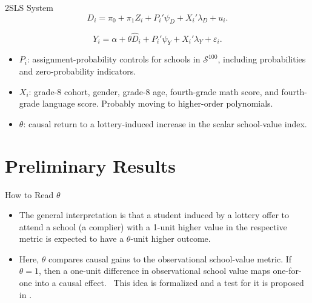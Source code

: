 \documentclass[notes,11pt,aspectratio=169]{beamer}
\newenvironment{wideitemize}{%
  \begin{minipage}{0.90\textwidth}
  \begin{itemize}
  \addtolength{\itemsep}{1em}
}{%
  \end{itemize}
  \end{minipage}
}
\begin{document}
\begin{frame}{2SLS System}
\small
\[
D_i
=
\pi_0
+
\pi_1 Z_i
+
P_i'\psi_D
+
X_i'\lambda_D
+
u_i .
\]

\[
Y_i
=
\alpha
+
\theta \widehat{D}_i
+
P_i'\psi_Y
+
X_i'\lambda_Y
+
\varepsilon_i .
\]

\vspace{0.6em}
\begin{wideitemize}
  \item \(P_i\): assignment-probability controls for schools in \(\mathcal{S}^{100}\), including probabilities and zero-probability indicators.
  \item \(X_i\): grade-8 cohort, gender, grade-8 age, fourth-grade math score, and fourth-grade language score. Probably moving to higher-order polynomials.
  \item \(\theta\): causal return to a lottery-induced increase in the scalar school-value index.
\end{wideitemize}
\end{frame}

\section{Preliminary Results}


\begin{frame}{How to Read \(\theta\)}
\begin{wideitemize}
  \item The general interpretation is that a student induced by a lottery offer to attend a school (a complier) with a 1-unit higher value in the respective metric is expected to have a $\theta$-unit higher outcome.

  \item Here, \(\theta\) compares causal gains to the observational school-value metric.
   If \(\theta=1\), then a one-unit difference in observational school value maps one-for-one into a causal effect. \ This idea is formalized and a test for it is proposed in \textcite{angrist_leveraging_2017}.

\end{wideitemize}
\end{frame}
\end{document}
